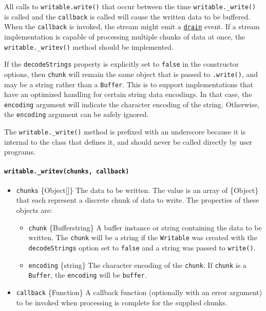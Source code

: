 All calls to \texttt{writable.write()} that occur between the time
\texttt{writable.\_write()} is called and the \texttt{callback} is
called will cause the written data to be buffered. When the
\texttt{callback} is invoked, the stream might emit a
\hyperref[event-drain]{\texttt{\textquotesingle{}drain\textquotesingle{}}}
event. If a stream implementation is capable of processing multiple
chunks of data at once, the \texttt{writable.\_writev()} method should
be implemented.

If the \texttt{decodeStrings} property is explicitly set to
\texttt{false} in the constructor options, then \texttt{chunk} will
remain the same object that is passed to \texttt{.write()}, and may be a
string rather than a \texttt{Buffer}. This is to support implementations
that have an optimized handling for certain string data encodings. In
that case, the \texttt{encoding} argument will indicate the character
encoding of the string. Otherwise, the \texttt{encoding} argument can be
safely ignored.

The \texttt{writable.\_write()} method is prefixed with an underscore
because it is internal to the class that defines it, and should never be
called directly by user programs.

\paragraph{\texorpdfstring{\texttt{writable.\_writev(chunks,\ callback)}}{writable.\_writev(chunks, callback)}}\label{writable._writevchunks-callback}

\begin{itemize}
\tightlist
\item
  \texttt{chunks} \{Object{[}{]}\} The data to be written. The value is
  an array of \{Object\} that each represent a discrete chunk of data to
  write. The properties of these objects are:

  \begin{itemize}
  \tightlist
  \item
    \texttt{chunk} \{Buffer\textbar string\} A buffer instance or string
    containing the data to be written. The \texttt{chunk} will be a
    string if the \texttt{Writable} was created with the
    \texttt{decodeStrings} option set to \texttt{false} and a string was
    passed to \texttt{write()}.
  \item
    \texttt{encoding} \{string\} The character encoding of the
    \texttt{chunk}. If \texttt{chunk} is a \texttt{Buffer}, the
    \texttt{encoding} will be
    \texttt{\textquotesingle{}buffer\textquotesingle{}}.
  \end{itemize}
\item
  \texttt{callback} \{Function\} A callback function (optionally with an
  error argument) to be invoked when processing is complete for the
  supplied chunks.
\end{itemize}


